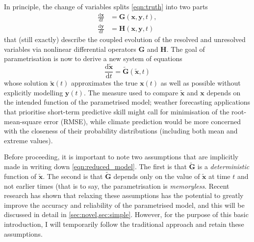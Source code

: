 \documentclass[titlepage,twoside]{article}
\numberwithin{equation}{section}
\newcommand{\diff}[2]{\frac{\mathrm{d} #1}{\mathrm{d} #2}}
\renewcommand\vec{\bm}
\begin{document}
In principle, the change of variables splits \cref{eqn:truth}
into two parts
\begin{align*}
    \diff{\vec{x}}{t} &= \vec{G}(\vec{x},\vec{y},t), \\
    \diff{\vec{y}}{t} &= \vec{H}(\vec{x},\vec{y},t)
\end{align*}
that (still exactly) describe the coupled evolution of the resolved and
unresolved variables via nonlinear differential operators $\vec{G}$ and
$\vec{H}$. The goal of parametrisation is now to derive a new system of
equations
\begin{equation} \label{eqn:reduced_model}
    \diff{\tilde{\vec{x}}}{t} = \tilde{\vec{G}}(\tilde{\vec{x}},t)
\end{equation}
whose solution $\tilde{\vec{x}}(t)$ approximates the true $\vec{x}(t)$ as well
as possible without explicitly modelling $\vec{y}(t)$. The measure used to
compare $\tilde{\vec{x}}$ and $\vec{x}$ depends on the intended function of the
parametrised model; weather forecasting applications that prioritise short-term
predictive skill might call for minimisation of the root-mean-square error
(RMSE), while climate prediction would be more concerned with the closeness of their probability distributions (including both mean and
extreme values).

Before proceeding, it is important to note two assumptions that are
implicitly made in writing down \cref{eqn:reduced_model}. The first is that
$\tilde{\vec{G}}$ is a \emph{deterministic} function of $\tilde{\vec{x}}$.
The second is that $\tilde{\vec{G}}$ depends only on the value of 
$\tilde{\vec{x}}$ at time $t$ and not earlier times (that is to say,
the parametrisation is \emph{memoryless}. Recent research has shown
that relaxing these assumptions has the potential to greatly improve
the accuracy and reliability of the parametrised model, and this will
be discussed in detail in \cref{sec:novel,sec:simple}. However, for
the purpose of this basic introduction, I will temporarily follow the
traditional approach and retain these assumptions.
\end{document}
